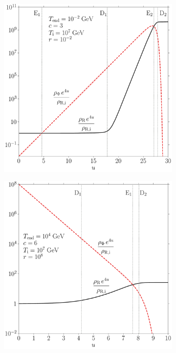 \documentclass[11pt,a4paper]{article}
\begin{document}
\begin{center}
	\begin{figure}[t!]
		\begin{subfigure}{0.5\textwidth}
			\includegraphics[width=1\textwidth]{figs/EMD.pdf}
			\caption{}
			\label{fig:EMD}
		\end{subfigure}
		\begin{subfigure}{0.5\textwidth}
			\includegraphics[width=1\textwidth]{figs/EKD.pdf}

\end{subfigure}
\end{figure}
\end{center}
\end{document}
